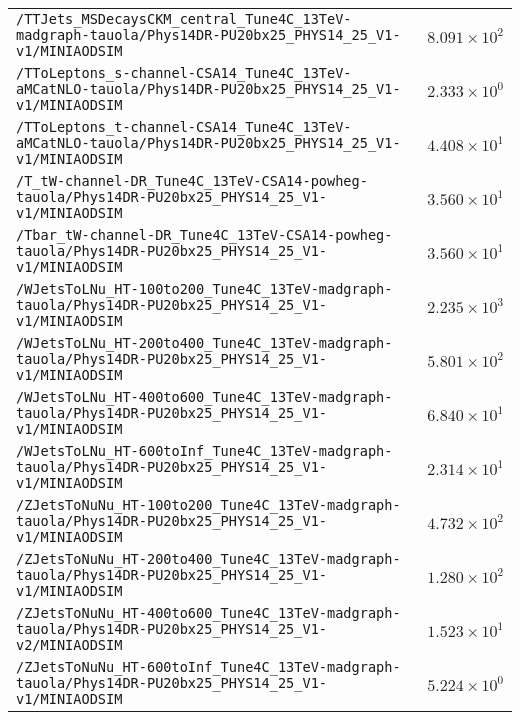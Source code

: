 \begin{center}
\begin{tabular}{lr}
\verb!/TTJets_MSDecaysCKM_central_Tune4C_13TeV-madgraph-tauola/Phys14DR-PU20bx25_PHYS14_25_V1-v1/MINIAODSIM! &$8.091\times 10^{2}$\tabularnewline
\verb!/TToLeptons_s-channel-CSA14_Tune4C_13TeV-aMCatNLO-tauola/Phys14DR-PU20bx25_PHYS14_25_V1-v1/MINIAODSIM! &$2.333\times 10^{0}$\tabularnewline
\verb!/TToLeptons_t-channel-CSA14_Tune4C_13TeV-aMCatNLO-tauola/Phys14DR-PU20bx25_PHYS14_25_V1-v1/MINIAODSIM! &$4.408\times 10^{1}$\tabularnewline
\verb!/T_tW-channel-DR_Tune4C_13TeV-CSA14-powheg-tauola/Phys14DR-PU20bx25_PHYS14_25_V1-v1/MINIAODSIM! &$3.560\times 10^{1}$\tabularnewline
\verb!/Tbar_tW-channel-DR_Tune4C_13TeV-CSA14-powheg-tauola/Phys14DR-PU20bx25_PHYS14_25_V1-v1/MINIAODSIM! &$3.560\times 10^{1}$\tabularnewline
\verb!/WJetsToLNu_HT-100to200_Tune4C_13TeV-madgraph-tauola/Phys14DR-PU20bx25_PHYS14_25_V1-v1/MINIAODSIM! &$2.235\times 10^{3}$\tabularnewline
\verb!/WJetsToLNu_HT-200to400_Tune4C_13TeV-madgraph-tauola/Phys14DR-PU20bx25_PHYS14_25_V1-v1/MINIAODSIM! &$5.801\times 10^{2}$\tabularnewline
\verb!/WJetsToLNu_HT-400to600_Tune4C_13TeV-madgraph-tauola/Phys14DR-PU20bx25_PHYS14_25_V1-v1/MINIAODSIM! &$6.840\times 10^{1}$\tabularnewline
\verb!/WJetsToLNu_HT-600toInf_Tune4C_13TeV-madgraph-tauola/Phys14DR-PU20bx25_PHYS14_25_V1-v1/MINIAODSIM! &$2.314\times 10^{1}$\tabularnewline
\verb!/ZJetsToNuNu_HT-100to200_Tune4C_13TeV-madgraph-tauola/Phys14DR-PU20bx25_PHYS14_25_V1-v1/MINIAODSIM! &$4.732\times 10^{2}$\tabularnewline
\verb!/ZJetsToNuNu_HT-200to400_Tune4C_13TeV-madgraph-tauola/Phys14DR-PU20bx25_PHYS14_25_V1-v1/MINIAODSIM! &$1.280\times 10^{2}$\tabularnewline
\verb!/ZJetsToNuNu_HT-400to600_Tune4C_13TeV-madgraph-tauola/Phys14DR-PU20bx25_PHYS14_25_V1-v2/MINIAODSIM! &$1.523\times 10^{1}$\tabularnewline
\verb!/ZJetsToNuNu_HT-600toInf_Tune4C_13TeV-madgraph-tauola/Phys14DR-PU20bx25_PHYS14_25_V1-v1/MINIAODSIM! &$5.224\times 10^{0}$\tabularnewline
\hline
\end{tabular}\end{center}
